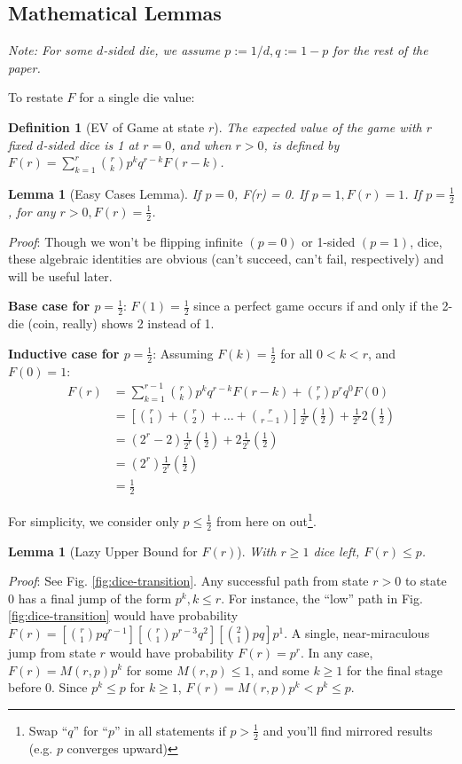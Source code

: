 \documentclass[11pt, oneside]{article} 	%
\newtheorem{lemma}[theorem]{Lemma}
\newtheorem{definition}[theorem]{Definition}
\begin{document}
\subsection{Mathematical Lemmas}

\textit{Note: For some $d$-sided die, we assume $p := 1/d, q := 1-p$ for the rest of the paper.}

To restate $F$ for a single die value:

\begin{definition}[EV of Game at state $r$]The expected value of the game with $r$ fixed $d$-sided dice is 1 at $r = 0$, and when $r > 0$, is defined by $F(r) = \sum_{k = 1}^r {r \choose k}p^kq^{r-k} F(r-k)$.\end{definition}

\begin{lemma}[Easy Cases Lemma] If $p = 0$, F(r) = 0.  If $p = 1, F(r) = 1$. If $p = \frac1{2}$, for any $r > 0,F(r) = \frac{1}{2}$.
\end{lemma}
\textit{Proof}: 
Though we won't be flipping infinite $(p=0)$ or 1-sided $(p=1)$, dice, these algebraic identities are obvious (can't succeed, can't fail, respectively) and will be useful later.

\textbf{Base case for $p=\frac1{2}$}: $F(1) = \frac1{2}$ since a perfect game occurs if and only if the 2-die (coin, really) shows 2 instead of 1.

\textbf{Inductive case for $p=\frac1{2}$}: Assuming $F(k) = \frac1{2}$ for all $0 < k < r$,  and $F(0) = 1$:
\begin{align*}
F(r) &= \sum_{k=1}^{r-1} {r \choose k} p^k q^{r-k} F(r-k) + {r \choose r} p^r q^0 F(0) \\
&= [ {r \choose 1}  +  {r \choose 2 } + \ldots +  {r \choose r-1}] \frac1{2^r} (\frac1{2}) + \frac1{2^r} 2(\frac1{2}) \\
&= (2^r - 2) \frac1{2^r} (\frac1{2}) + 2\frac1{2^r} (\frac1{2}) \\
&= (2^r) \frac1{2^r} (\frac1{2})\\
&=  \frac1{2}
\end{align*}

For simplicity, we consider only $p \leq \frac1{2}$ from here on out\footnote{Swap ``$q$'' for ``$p$'' in all statements if $p > \frac1{2}$ and you'll find mirrored results (e.g. $p$ converges upward)}. 

\begin{lemma}[Lazy Upper Bound for $F(r)$] With $r \geq 1$ dice left, $F(r) \leq p$.
\end{lemma}
\textit{Proof}: See Fig. \ref{fig:dice-transition}.  Any successful path from state $r > 0$ to state $0$ has a final jump of the form $p^k, k \leq r$.  For instance, the ``low'' path in Fig. \ref{fig:dice-transition} would have probability $F(r) = [{r \choose 1}pq^{r-1}] [{r \choose 1}p^{r-3}q^2] [{2 \choose 1}pq] p^1$.  A single, near-miraculous jump from state $r$ would have probability $F(r) = p^r$.  In any case, $F(r) = M(r,p)p^k$ for some $M(r,p) \leq 1$, and some $k \geq 1$ for the final stage before 0.  Since $p^k \leq p$ for $k \geq 1$, $F(r) = M(r,p)p^k < p^k \leq p$.
\end{document}
